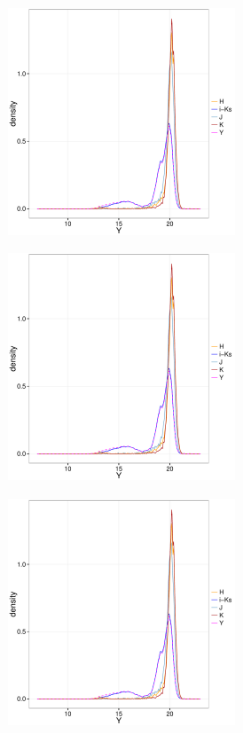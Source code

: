 \begin{figure}[ht!]
    \centering
    \begin{subfigure}[t]{0.45\textwidth}
        \includegraphics[page=1,height=6cm]{background/Figures/MissingDistributions.pdf}
    \end{subfigure}
    \begin{subfigure}[t]{0.45\textwidth}
      \includegraphics[page=2,height=6cm]{background/Figures/MissingDistributions.pdf}
    \end{subfigure}
     \begin{subfigure}[t]{0.45\textwidth}
      \includegraphics[page=3,height=6cm]{background/Figures/MissingDistributions.pdf}
    \end{subfigure}
     \begin{subfigure}[t]{0.45\textwidth}

\end{subfigure}
\end{figure}
